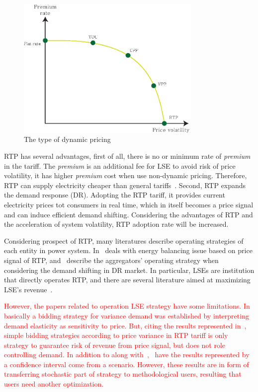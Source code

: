 \documentclass[journal]{IEEEtran} %
\begin{document}
\begin{figure}[t!]
\centering
  \includegraphics[width=3.5in]{type_DP}
\caption{The type of dynamic pricing}
\label{type_DP}       %
\end{figure}

RTP has several advantages, first of all, there is no or minimum rate of \textit{premium} in the tariff. The \textit{premium} is an additional fee for LSE to avoid risk of price volatility, it has higher \textit{premium} cost when use non-dynamic pricing. Therefore, RTP can supply electricity cheaper than general tariffs~\cite{boeve2021asset}. Second, RTP expands the demand response (DR). Adopting the RTP tariff, it provides current electricity prices tot consumers in real time, which in itself becomes a price signal and can induce efficient demand shifting. Considering the advantages of RTP and the acceleration of system volatility, RTP adoption rate will be increased.

Considering prospect of RTP, many literatures describe operating strategies of each entity in power system. In~\cite{roozbehani2012volatility, samadi2011optimal} deals with energy balancing issue based on price signal of RTP, and~\cite{pei2016optimal, wang2020day} describe the aggregators' operating strategy when considering the demand shifting in DR market. In particular, LSEs are institution that directly operates RTP, and there are several literature aimed at maximizing LSE's revenue~\cite{kazemi2014risk, safdarian2013impacts, alipour2018hedging, samadi2010optimal}.

\textcolor{red}{However, the papers related to operation LSE strategy have some limitations. In~\cite{kazemi2014risk, safdarian2013impacts} basically a bidding strategy for variance demand was established by interpreting demand elasticity as sensitivity to price. But, citing the results represented in~\cite{boeve2021asset, fabra2021estimating}, simple bidding strategies according to price variance in RTP tariff is only strategy to guarantee risk of revenue from price signal, but does not role controlling demand. In addition to along with~\cite{kazemi2014risk},~\cite{wang2020day, alipour2018hedging} have the results represented by a confidence interval come from a scenario. However, these results are in form of transferring stochastic part of strategy to methodological users, resulting that users need another optimization.}
\end{document}
